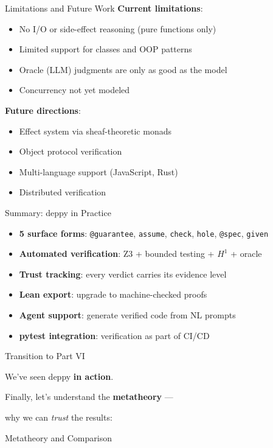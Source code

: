 \documentclass[aspectratio=169,11pt]{beamer}
\begin{document}
\begin{frame}{Limitations and Future Work}
\textbf{Current limitations}:
\begin{itemize}
\item No I/O or side-effect reasoning (pure functions only)
\item Limited support for classes and OOP patterns
\item Oracle (LLM) judgments are only as good as the model
\item Concurrency not yet modeled
\end{itemize}

\vspace{0.5em}
\textbf{Future directions}:
\begin{itemize}
\item Effect system via sheaf-theoretic monads
\item Object protocol verification
\item Multi-language support (JavaScript, Rust)
\item Distributed verification
\end{itemize}
\end{frame}

\begin{frame}{Summary: deppy in Practice}
\begin{itemize}
\item \textbf{5 surface forms}: \texttt{@guarantee}, \texttt{assume}, \texttt{check}, \texttt{hole}, \texttt{@spec}, \texttt{given}
\item \textbf{Automated verification}: Z3 + bounded testing + $H^1$ + oracle
\item \textbf{Trust tracking}: every verdict carries its evidence level
\item \textbf{Lean export}: upgrade to machine-checked proofs
\item \textbf{Agent support}: generate verified code from NL prompts
\item \textbf{pytest integration}: verification as part of CI/CD
\end{itemize}
\end{frame}

\begin{frame}{Transition to Part VI}
\begin{center}
{\Large We've seen deppy \textbf{in action}.}

\vspace{1em}
Finally, let's understand the \textbf{metatheory} ---

why we can \emph{trust} the results:

\vspace{1em}
{\LARGE\color{blue} Metatheory and Comparison}
\end{center}
\end{frame}
\end{document}
